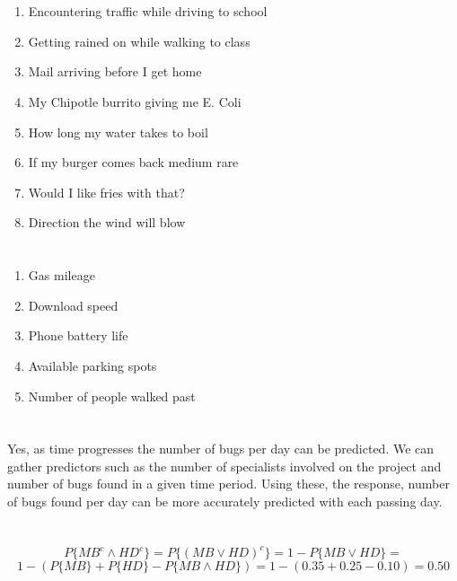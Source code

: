 \documentclass{article}
\begin{document}
\section{}
\begin{enumerate}
 \item Encountering traffic while driving to school
 \item Getting rained on while walking to class
 \item Mail arriving before I get home
 \item My Chipotle burrito giving me E. Coli
 \item How long my water takes to boil
 \item If my burger comes back medium rare
 \item Would I like fries with that?
 \item Direction the wind will blow
\end{enumerate}

\section{}
\begin{enumerate}
 \item Gas mileage
 \item Download speed
 \item Phone battery life
 \item Available parking spots
 \item Number of people walked past 
\end{enumerate}

\section{}
Yes, as time progresses the number of bugs per day can be predicted. We can gather predictors such as the number of specialists involved on the project and number of bugs found in a given time period. Using these, the response, number of bugs found per day can be more accurately predicted with each passing day.


\section{}
\[ P \{\mathit{MB}^c \land \mathit{HD}^c \} = P\{  (\mathit{MB} \lor \mathit{HD})^c \} = 1 - P\{\mathit{MB} \lor \mathit{HD}\} =\]
\[1-(P\{\mathit{MB}\} +P\{\mathit{HD}\} - P\{\mathit{MB} \land \mathit{HD}\} ) = 1 - (0.35 + 0.25 -0.10) = 0.50\]
\end{document}
